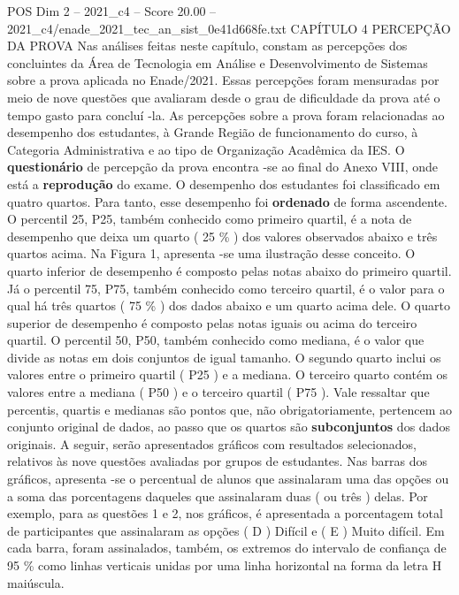 \begin{textsample}{POS Dim 2 – 2021\_c4 – Score 20.00 – 2021\_c4/enade\_2021\_tec\_an\_sist\_0e41d668fe.txt}  \label{ex:f2_pos_032}
CAPÍTULO 4 PERCEPÇÃO DA PROVA Nas análises feitas neste capítulo, constam as percepções dos concluintes da Área de Tecnologia em Análise e Desenvolvimento de Sistemas sobre a prova aplicada no Enade/2021.
Essas percepções foram mensuradas por meio de nove questões que avaliaram desde o grau de dificuldade da prova até o tempo gasto para concluí -la.
As percepções sobre a prova foram relacionadas ao desempenho dos estudantes, à Grande Região de funcionamento do curso, à Categoria Administrativa e ao tipo de Organização Acadêmica da IES.
O \textbf{questionário} de percepção da prova encontra -se ao final do Anexo VIII, onde está a \textbf{reprodução} do exame.
O desempenho dos estudantes foi classificado em quatro quartos.
Para tanto, esse desempenho foi \textbf{ordenado} de forma ascendente.
O percentil 25, P25, também conhecido como primeiro quartil, é a nota de desempenho que deixa um quarto ( 25 \% ) dos valores observados abaixo e três quartos acima.
Na Figura 1, apresenta -se uma ilustração desse conceito.
O quarto inferior de desempenho é composto pelas notas abaixo do primeiro quartil.
Já o percentil 75, P75, também conhecido como terceiro quartil, é o valor para o qual há três quartos ( 75 \% ) dos dados abaixo e um quarto acima dele.
O quarto superior de desempenho é composto pelas notas iguais ou acima do terceiro quartil.
O percentil 50, P50, também conhecido como mediana, é o valor que divide as notas em dois conjuntos de igual tamanho.
O segundo quarto inclui os valores entre o primeiro quartil ( P25 ) e a mediana.
O terceiro quarto contém os valores entre a mediana ( P50 ) e o terceiro quartil ( P75 ).
Vale ressaltar que percentis, quartis e medianas são pontos que, não obrigatoriamente, pertencem ao conjunto original de dados, ao passo que os quartos são \textbf{subconjuntos} dos dados originais.
A seguir, serão apresentados gráficos com resultados selecionados, relativos às nove questões avaliadas por grupos de estudantes.
Nas barras dos gráficos, apresenta -se o percentual de alunos que assinalaram uma das opções ou a soma das porcentagens daqueles que assinalaram duas ( ou três ) delas.
Por exemplo, para as questões 1 e 2, nos gráficos, é apresentada a porcentagem total de participantes que assinalaram as opções ( D ) Difícil e ( E ) Muito difícil.
Em cada barra, foram assinalados, também, os extremos do intervalo de confiança de 95 \% como linhas verticais unidas por uma linha horizontal na forma da letra H maiúscula.

\end{textsample}
